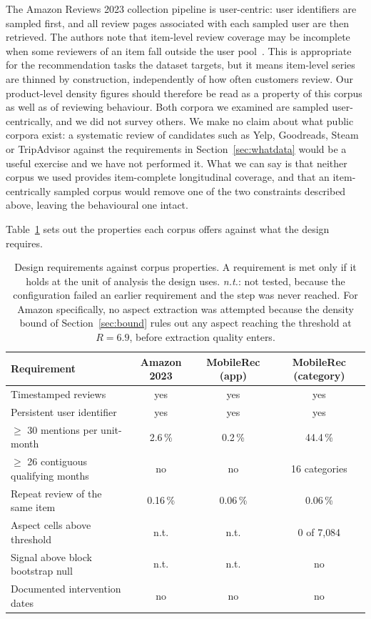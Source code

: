 \documentclass[11pt,a4paper]{article}
\begin{document}
The Amazon Reviews 2023 collection pipeline is user-centric: user identifiers
are sampled first, and all review pages associated with each sampled user are
then retrieved. The authors note that item-level review coverage may be
incomplete when some reviewers of an item fall outside the user
pool~\citep{hou2026}. This is appropriate for the recommendation tasks the
dataset targets, but it means item-level series are thinned by construction,
independently of how often customers review. Our product-level density figures
should therefore be read as a property of this corpus as well as of reviewing
behaviour. Both corpora we examined are sampled user-centrically, and we did not survey
others. We make no claim about what public corpora exist: a systematic review
of candidates such as Yelp, Goodreads, Steam or TripAdvisor against the
requirements in Section~\ref{sec:whatdata} would be a useful exercise and we
have not performed it. What we can say is that neither corpus we used provides
item-complete longitudinal coverage, and that an item-centrically sampled
corpus would remove one of the two constraints described above, leaving the
behavioural one intact.

Table~\ref{tab:provenance} sets out the properties each corpus offers against
what the design requires.

\begin{table}[htbp]
\centering
\caption{Design requirements against corpus properties. A requirement is met
only if it holds at the unit of analysis the design uses. \textit{n.t.}: not
tested, because the configuration failed an earlier requirement and the step was
never reached. For Amazon specifically, no aspect extraction was attempted
because the density bound of Section~\ref{sec:bound} rules out any aspect
reaching the threshold at $R = 6.9$, before extraction quality enters.}
\label{tab:provenance}
\small
\begin{tabular}{@{}p{5.0cm}ccc@{}}
\toprule
\textbf{Requirement} & \textbf{Amazon 2023} & \textbf{MobileRec (app)} &
\textbf{MobileRec (category)} \\
\midrule
Timestamped reviews & yes & yes & yes \\
Persistent user identifier & yes & yes & yes \\
$\geq$ 30 mentions per unit-month & 2.6\,\% & 0.2\,\% & 44.4\,\% \\
$\geq$ 26 contiguous qualifying months & no & no & 16 categories \\
Repeat review of the same item & 0.16\,\% & 0.06\,\% & 0.06\,\% \\
Aspect cells above threshold & n.t. & n.t. & 0 of 7{,}084 \\
Signal above block bootstrap null & n.t. & n.t. & no \\
Documented intervention dates & no & no & no \\
\bottomrule
\end{tabular}
\end{table}
\end{document}
